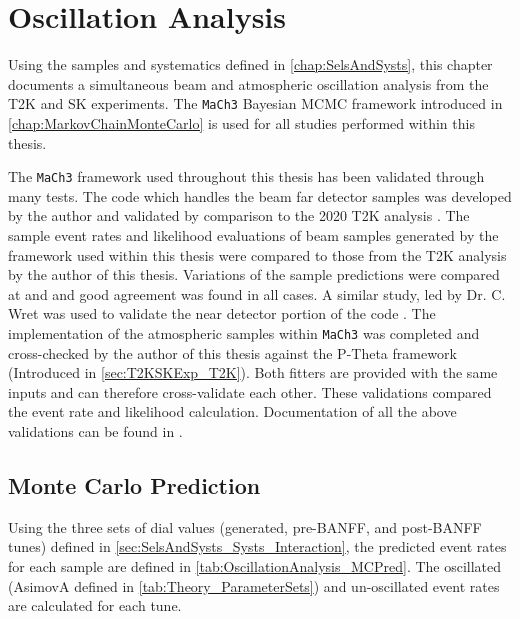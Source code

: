 \chapter{Oscillation Analysis}
\label{chap:OscillationAnalysis}

Using the samples and systematics defined in \autoref{chap:SelsAndSysts}, this chapter documents a simultaneous beam and atmospheric oscillation analysis from the T2K and SK experiments. The \texttt{MaCh3} Bayesian MCMC framework introduced in \autoref{chap:MarkovChainMonteCarlo} is used for all studies performed within this thesis.

The \texttt{MaCh3} framework used throughout this thesis has been validated through many tests. The code which handles the beam far detector samples was developed by the author and validated by comparison to the 2020 T2K analysis \cite{Dunne2020-uf}. The sample event rates and likelihood evaluations of beam samples generated by the framework used within this thesis were compared to those from the T2K analysis by the author of this thesis. Variations of the sample predictions were compared at \quickmath{\pm 1 \sigma} and \quickmath{\pm 3 \sigma} and good agreement was found in all cases. A similar study, led by Dr. C. Wret was used to validate the near detector portion of the code \cite{t2k_tn_426}. The implementation of the atmospheric samples within \texttt{MaCh3} was completed and cross-checked by the author of this thesis against the P-Theta framework (Introduced in \autoref{sec:T2KSKExp_T2K}). Both fitters are provided with the same inputs and can therefore cross-validate each other. These validations compared the event rate and likelihood calculation. Documentation of all the above validations can be found in \cite{t2k_tn_426}.

\section{Monte Carlo Prediction}
\label{sec:OscillationAnalysis_MonteCarloPred}

Using the three sets of dial values (generated, pre-BANFF, and post-BANFF tunes) defined in \autoref{sec:SelsAndSysts_Systs_Interaction}, the predicted event rates for each sample are defined in \autoref{tab:OscillationAnalysis_MCPred}. %
The oscillated (AsimovA defined in \autoref{tab:Theory_ParameterSets}) and un-oscillated event rates are calculated for each tune.

